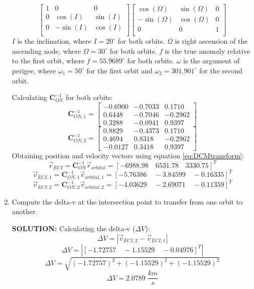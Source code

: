 \documentclass[12pt, letterpaper]{aiaa-tc}
\begin{document}
\begin{enumerate}
\[\begin{bmatrix}
        1 & 0 & 0 \\
        0 & \cos(I) & \sin(I) \\
        0 & -\sin(I) & \cos(I) \\
    \end{bmatrix}
    \begin{bmatrix}
        \cos(\Omega) & \sin(\Omega) & 0 \\
        -\sin(\Omega) & \cos(\Omega) & 0 \\
        0 & 0 & 1 \\
    \end{bmatrix} \]
    $I$ is the inclination, where $I=20^{\circ}$ for both orbits.
    $\Omega$ is right ascension of the ascending node, where $\Omega=30^{\circ}$ for both orbits.
    $f$ is the true anomaly relative to the first orbit, where $f=55.9689^{\circ}$ for both orbits.
    $\omega$ is the argument of perigee, where $\omega_1=50^{\circ}$ for the first orbit and 
    $\omega_2=301.901^{\circ}$ for the second orbit.

    Calculating $\bm{C}^{-1}_{ON}$ for both orbits:
    \[ \bm{C}^{-1}_{ON,1}=
    \begin{bmatrix}
        -0.6900 & -0.7033 & 0.1710\\ 0.6448 & -0.7046 & -0.2962\\ 0.3288 & -0.0941 & 0.9397
    \end{bmatrix}\]
    \[ \bm{C}^{-1}_{ON,2}=
    \begin{bmatrix}
        0.8829 & -0.4373 & 0.1710\\ 0.4694 & 0.8318 & -0.2962\\ -0.0127 & 0.3418 & 0.9397
    \end{bmatrix}\]
    Obtaining position and velocity vectors using equation \eqref{eq:DCMtransform}:
    \[ \vec{r}_{ECI}=\bm{C}^{-1}_{ON}\vec{r}_{orbital}=[-6988.98\quad 6531.78\quad 3330.75]^T \]
    \[ \vec{v}_{ECI,1}=\bm{C}^{-1}_{ON,1}\vec{v}_{orbital,1}=[ -5.76386\quad -3.84599\quad -0.16335]^T \]
    \[ \vec{v}_{ECI,2}=\bm{C}^{-1}_{ON,2}\vec{v}_{orbital,2}=[-4.03629\quad -2.69071\quad -0.11359]^T \]
    \item Compute the delta-v at the intersection point to transfer from one orbit to another.
    
    \textbf{SOLUTION:}
    Calculating the delta-v ($\Delta V$):
    \[ \Delta V=|\vec{v}_{ECI,2}-\vec{v}_{ECI,1}| \]
    \[ \Delta V=|[-1.72757\quad -1.15529\quad -0.04976]^T| \]
    \[ \Delta V=\sqrt{(-1.72757)^2+(-1.15529)^2+(-1.15529)^2} \]
    \[ \Delta V=2.0789\;\frac{km}{s} \]

\end{enumerate}
\end{document}
